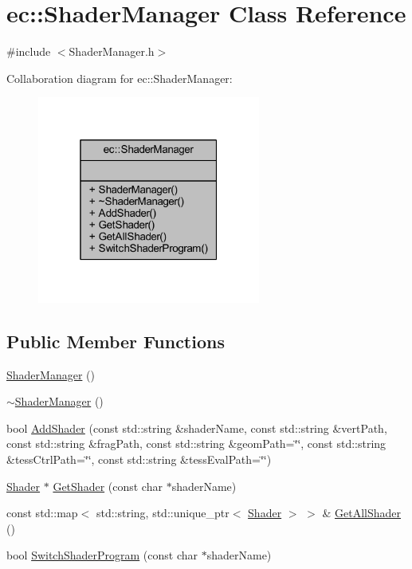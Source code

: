 \hypertarget{classec_1_1_shader_manager}{}\section{ec\+:\+:Shader\+Manager Class Reference}
\label{classec_1_1_shader_manager}


{\ttfamily \#include $<$Shader\+Manager.\+h$>$}



Collaboration diagram for ec\+:\+:Shader\+Manager\+:\nopagebreak
\begin{figure}[H]
\begin{center}
\leavevmode
\includegraphics[width=208pt]{classec_1_1_shader_manager__coll__graph}
\end{center}
\end{figure}
\subsection*{Public Member Functions}
\begin{DoxyCompactItemize}
\item 
\mbox{\hyperlink{classec_1_1_shader_manager_a6064ffe0b832b2744eeb83a6aef563b7}{Shader\+Manager}} ()
\item 
\mbox{\hyperlink{classec_1_1_shader_manager_afda0f442e5f6194cfd4253b9def34f0a}{$\sim$\+Shader\+Manager}} ()
\item 
bool \mbox{\hyperlink{classec_1_1_shader_manager_ad66bcc74668f5d872afb6fd47709c630}{Add\+Shader}} (const std\+::string \&shader\+Name, const std\+::string \&vert\+Path, const std\+::string \&frag\+Path, const std\+::string \&geom\+Path=\char`\"{}\char`\"{}, const std\+::string \&tess\+Ctrl\+Path=\char`\"{}\char`\"{}, const std\+::string \&tess\+Eval\+Path=\char`\"{}\char`\"{})
\item 
\mbox{\hyperlink{classec_1_1_shader}{Shader}} $\ast$ \mbox{\hyperlink{classec_1_1_shader_manager_a52f341542759f5fd2c0013133f1007ab}{Get\+Shader}} (const char $\ast$shader\+Name)
\item 
const std\+::map$<$ std\+::string, std\+::unique\+\_\+ptr$<$ \mbox{\hyperlink{classec_1_1_shader}{Shader}} $>$ $>$ \& \mbox{\hyperlink{classec_1_1_shader_manager_a0a0cc15d1f843a8bc39999792c26e762}{Get\+All\+Shader}} ()
\item 
bool \mbox{\hyperlink{classec_1_1_shader_manager_a19b4d35481ff18573de99722c62064b0}{Switch\+Shader\+Program}} (const char $\ast$shader\+Name)
\end{DoxyCompactItemize}



